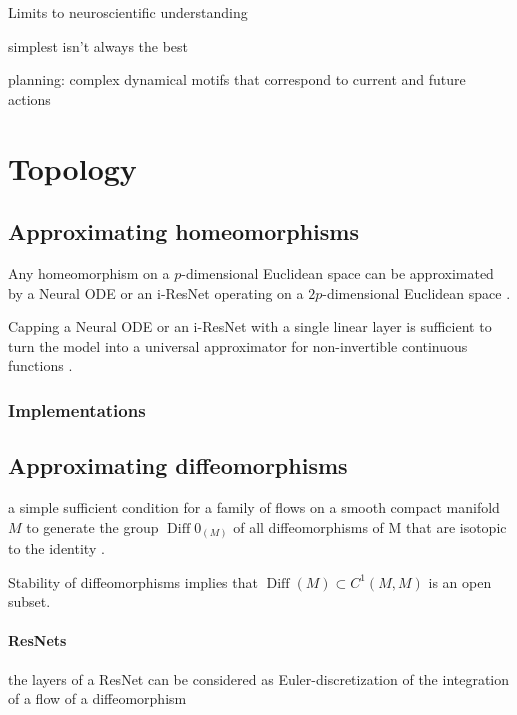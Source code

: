 \documentclass{article}
\theoremstyle{definition} \newtheorem{definition}{Definition}  \newtheorem{example}{Example}
\theoremstyle{remark} \newtheorem{remark}{Remark}
\newcommand{\Diff}{\operatorname{Diff}}
\newcounter{ct}
\begin{document}
Limits to neuroscientific understanding \citep{chirimuuta2024brain}


simplest isn't always the best \citep{dyer2023simplest}


planning: complex dynamical motifs that correspond to current and future actions \citep{vyas2020ctd}


\newpage




\newpage
\appendix


\section{Topology}\label{sec:topology}

\subsection{Approximating homeomorphisms}\label{sec:homeomorphisms}


Any homeomorphism on a $p$-dimensional Euclidean space can be approximated by a Neural ODE or an i-ResNet operating on a $2p$-dimensional Euclidean space \citep{zhang2020approximation}.

Capping a Neural ODE or an i-ResNet with a single linear layer is sufficient to turn the model into a universal approximator for non-invertible continuous functions \citep{zhang2020approximation}.

\subsubsection{Implementations}



\subsection{Approximating diffeomorphisms}\label{sec:diffeomorphisms}

a simple sufficient condition for a family of flows on a smooth compact manifold $M$ to generate the group $\Diff0_(M)$ of all diffeomorphisms of M that are isotopic to the identity \citep{caponigro2010families}.

Stability of diffeomorphisms implies that $\Diff(M)\subset C^1(M,M)$  is an open subset.


\paragraph{ResNets}
the layers of a ResNet can be considered as Euler-discretization of the integration of a flow of a diffeomorphism\citep{rousseau2020residual}
\end{document}
